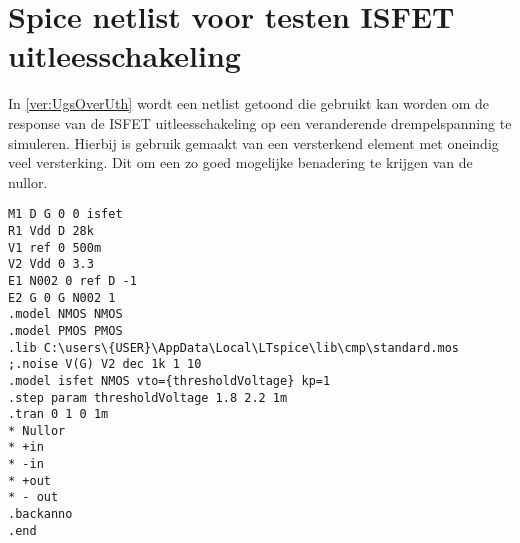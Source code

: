 \section{Spice netlist voor testen ISFET uitleesschakeling}
In \cref{ver:UgsOverUth} wordt een netlist getoond die gebruikt kan worden om de response van de ISFET uitleesschakeling op een veranderende drempelspanning te simuleren. Hierbij is gebruik gemaakt van een versterkend element met oneindig veel versterking. Dit om een zo goed mogelijke benadering te krijgen van de nullor.

\begin{lstlisting}[caption=Spice netlist om de gate source spanningsresponse op een verandering in de drempelspannng te simuleren., captionpos=b, label=ver:UgsOverUth]
M1 D G 0 0 isfet
R1 Vdd D 28k
V1 ref 0 500m
V2 Vdd 0 3.3
E1 N002 0 ref D -1
E2 G 0 G N002 1
.model NMOS NMOS
.model PMOS PMOS
.lib C:\users\{USER}\AppData\Local\LTspice\lib\cmp\standard.mos
;.noise V(G) V2 dec 1k 1 10
.model isfet NMOS vto={thresholdVoltage} kp=1
.step param thresholdVoltage 1.8 2.2 1m
.tran 0 1 0 1m
* Nullor
* +in
* -in
* +out
* - out
.backanno
.end
\end{lstlisting}
